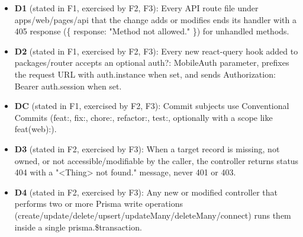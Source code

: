 \begin{itemize}[nosep]
\item \textbf{D1} (stated in F1, exercised by F2, F3): Every API route file under apps/web/pages/api that the change adds or modifies ends its handler with a 405 response (\{ response: "Method not allowed." \}) for unhandled methods.
\item \textbf{D2} (stated in F1, exercised by F2, F3): Every new react-query hook added to packages/router accepts an optional auth?: MobileAuth parameter, prefixes the request URL with auth.instance when set, and sends Authorization: Bearer auth.session when set.
\item \textbf{DC} (stated in F1, exercised by F2, F3): Commit subjects use Conventional Commits (feat:, fix:, chore:, refactor:, test:, optionally with a scope like feat(web):).
\item \textbf{D3} (stated in F2, exercised by F3): When a target record is missing, not owned, or not accessible/modifiable by the caller, the controller returns status 404 with a "<Thing> not found." message, never 401 or 403.
\item \textbf{D4} (stated in F2, exercised by F3): Any new or modified controller that performs two or more Prisma write operations (create/update/delete/upsert/updateMany/deleteMany/connect) runs them inside a single prisma.\$transaction.
\end{itemize}
